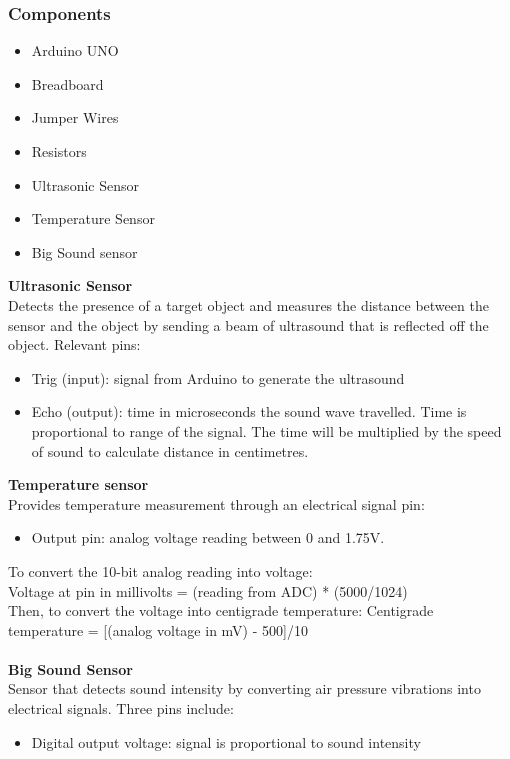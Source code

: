 \documentclass[12pt, titlepage]{article}
\begin{document}
\subsubsection{Components}
\begin{itemize}
    \item Arduino UNO
    \item Breadboard
    \item Jumper Wires
    \item Resistors
    \item Ultrasonic Sensor
    \item Temperature Sensor
    \item Big Sound sensor
\end{itemize}
\textbf{Ultrasonic Sensor}\\ 
Detects the presence of a target object and measures the distance between the sensor and the object by sending a beam of ultrasound that is reflected off the object. Relevant pins: 
\begin{itemize}
    \item Trig (input): signal from Arduino to generate the ultrasound
    \item Echo (output): time in microseconds the sound wave travelled. Time is proportional to range of the signal. The time will be multiplied by the speed of sound to calculate distance in centimetres.
\end{itemize}
\textbf{Temperature sensor}  \\
Provides temperature measurement through an electrical signal pin:
\begin{itemize}
    \item Output pin: analog voltage reading between 0 and 1.75V. 
\end{itemize}
To convert the 10-bit analog reading into voltage: \\
Voltage at pin in millivolts = (reading from ADC) * (5000/1024) \\
Then, to convert the voltage into centigrade temperature: 
Centigrade temperature = [(analog voltage in mV) - 500]/10 \\ \\
\textbf{Big Sound Sensor} \\
Sensor that detects sound intensity by converting air pressure vibrations into electrical signals. Three pins include:
\begin{itemize}
    \item Digital output voltage: signal is proportional to sound intensity
\end{itemize}
\end{document}
